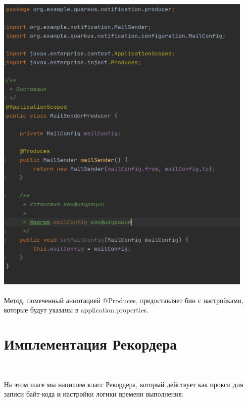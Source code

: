\documentclass[russian,11pt]{article}
\begin{document}
\paragraph{\includegraphics[scale=0.5, width=\textwidth, height=15cm]{7}}
	
	Метод, помеченный аннотацией @Produces, предоставляет бин с настройками, которые будут указаны в application.properties.

\section{Имплементация Рекордера}
~

На этом шаге мы напишем класс Рекордера, который действует как прокси для записи байт-кода и настройки логики времени выполнения:
\end{document}
